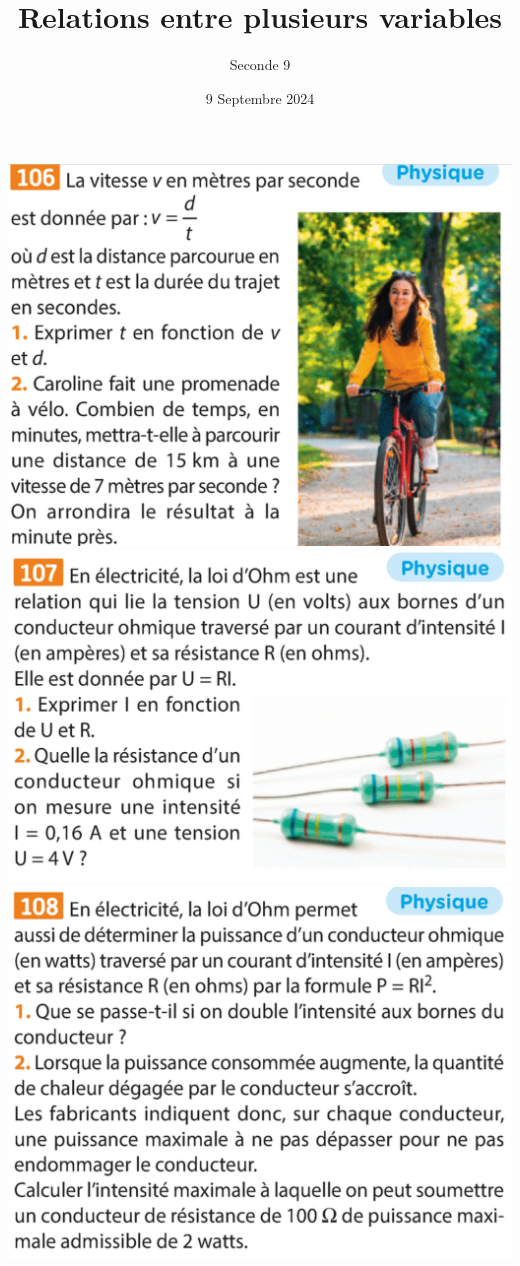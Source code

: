 \documentclass{article}
\title{Relations entre plusieurs variables}
\date{9 Septembre 2024}
\author{Seconde 9}
\begin{document}
\maketitle

\begin{center}
\includegraphics[width=\textwidth]{Exo1.png}
\includegraphics[width=\textwidth]{Exo2.png}
\includegraphics[width=\textwidth]{Exo3.png}
\end{center}
\end{document}
